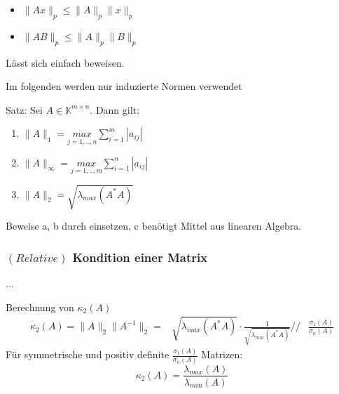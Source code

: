 \begin{itemize}
\item{$\|Ax\|_p \leq \|A\|_p \|x\|_p$}
\item{$\|A B\|_p \leq \|A\|_p \|B\|_p$}
\end{itemize}
Lässt sich einfach beweisen.

Im folgenden werden nur induzierte Normen verwendet

Satz: Sei $A \in \mathbb{K}^{m \times n}$. Dann gilt:
\begin{enumerate}
\item{$\|A\|_1 = \underset{j = 1,..,n}{max} \sum\limits_{i=1}^{m}{\left|a_{ij}\right|}$ } %
\item{$\|A\|_{\infty} = \underset{j = 1,..,m}{max} \sum\limits_{i=1}^{n}{\left|a_{ij}\right|}$ } %
\item{$\|A\|_2 = \sqrt{\lambda_{max}\left(A^*A\right)}$}
\end{enumerate}
Beweise a, b durch einsetzen, c benötigt Mittel aus linearen Algebra.

\subsubsection{$\left(Relative\right)$ Kondition einer Matrix}
...

Berechnung von $\kappa_2\left(A\right)$
\begin{equation*}
  \begin{align*}
    \kappa_2(A) = \|A\|_2 \|A^{-1}\|_2 = &\sqrt{\lambda_{max}\left(A^*A\right)} \cdot \frac{1}{\sqrt{\lambda_{min}\left(A^*A\right)}} //
    & \frac{\sigma_1\left(A\right)}{\sigma_n\left(A\right)}
  \end{align*}
\end{equation*}
Für symmetrische und positiv definite $\frac{\sigma_1\left(A\right)}{\sigma_n\left(A\right)}$ Matrizen:
\begin{equation*}
  \kappa_2(A) = \frac{\lambda_{max}\left(A\right)}{\lambda_{min}\left(A\right)}
\end{equation*}

